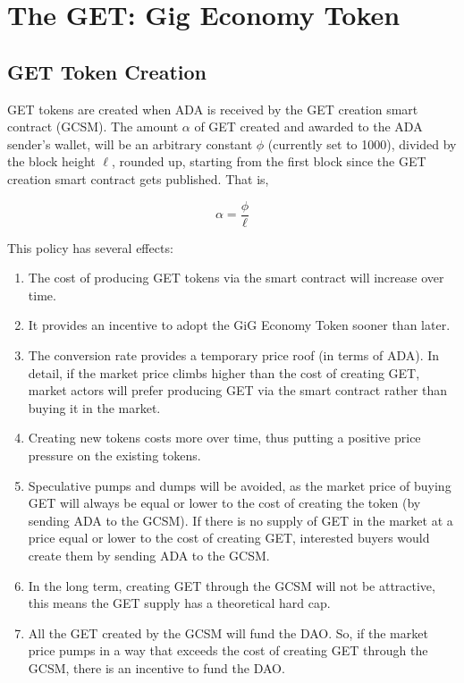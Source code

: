 \documentclass{article}
\begin{document}
\section{The GET: Gig Economy Token}


\subsection{GET Token Creation}
GET tokens are created when ADA is received by the GET creation smart contract (GCSM).
The amount $\alpha$ of GET created and awarded to the ADA sender's wallet, will be an arbitrary constant $\phi$ (currently set to 1000), divided by the block height $\ell$, rounded up, starting from the first block since the GET creation smart contract gets published. That is,

\[ \alpha
  = \dfrac{\phi}{\ell}
\]

This policy has several effects:

\begin{enumerate}

  \item The cost of producing GET tokens via the smart contract will increase over time. 
  \item It provides an incentive to adopt the GiG Economy Token sooner than later. 
  \item The conversion rate provides a temporary price roof (in terms of ADA). In detail, if the market price climbs higher than the cost of creating GET, market actors will prefer producing GET via the smart contract rather than buying it in the market.
  \item Creating new tokens costs more over time, thus putting a positive price pressure on the existing tokens.
  \item Speculative pumps and dumps will be avoided, as the market price of buying GET will always be equal or lower to the cost of creating the token (by sending ADA to the GCSM). If there is no supply of GET in the market at a price equal or lower to the cost of creating GET, interested buyers would create them by sending ADA to the GCSM. 
  \item In the long term, creating GET through the GCSM will not be attractive, this means the GET supply has a theoretical hard cap.
  \item All the GET created by the GCSM will fund the DAO. So, if the market price pumps in a way that exceeds the cost of creating GET through the GCSM, there is an incentive to fund the DAO.
\end{enumerate}
\end{document}

